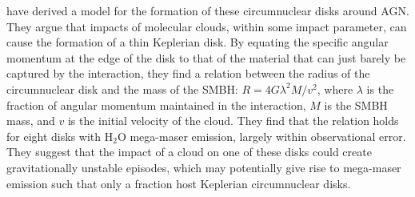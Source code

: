 \citet{wardle2012_bhmass} have derived a model for the formation of these circumnuclear disks around AGN. They argue that impacts of molecular clouds, within some impact parameter, can cause the formation of a thin Keplerian disk. By equating the specific angular momentum at the edge of the disk to that of the material that can just barely be captured by the interaction, they find a relation between the radius of the circumnuclear disk and the mass of the SMBH: $R=4G\lambda^2M/v^2$, where $\lambda$ is the fraction of angular momentum maintained in the interaction, $M$ is the SMBH mass, and $v$ is the initial velocity of the cloud. They find that the relation holds for eight disks with H$_2$O mega-maser emission, largely within observational error. They suggest that the impact of a cloud on one of these disks could create gravitationally unstable episodes, which may potentially give rise to mega-maser emission \citep{Milosavljevi_2004} such that only a fraction host Keplerian circumnuclear disks.

